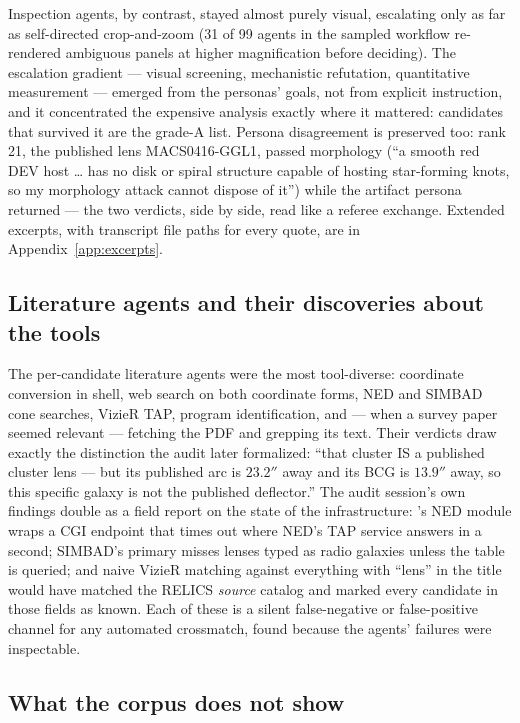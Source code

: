 \documentclass[11pt,letterpaper]{article}
\begin{document}
Inspection agents, by contrast, stayed almost purely visual, escalating only
as far as self-directed crop-and-zoom (31 of 99 agents in the sampled
workflow re-rendered ambiguous panels at higher magnification before
deciding). The escalation gradient --- visual screening, mechanistic
refutation, quantitative measurement --- emerged from the personas' goals,
not from explicit instruction, and it concentrated the expensive analysis
exactly where it mattered: candidates that survived it are the grade-A list.
Persona disagreement is preserved too: rank 21, the published lens
MACS0416-GGL1, passed morphology (``a smooth red DEV host \ldots{} has no
disk or spiral structure capable of hosting star-forming knots, so my
morphology attack cannot dispose of it'') while the artifact persona returned
 --- the two verdicts, side by side, read like a referee
exchange. Extended excerpts, with transcript file paths for every quote, are
in Appendix~\ref{app:excerpts}.

\subsection{Literature agents and their discoveries about the tools}
\label{sec:litagents}

The per-candidate literature agents were the most tool-diverse: coordinate
conversion in shell, web search on both coordinate forms, NED and SIMBAD cone
searches, VizieR TAP, program identification, and --- when a survey paper
seemed relevant --- fetching the PDF and grepping its text. Their verdicts
draw exactly the distinction the audit later formalized: ``that cluster IS a
published cluster lens --- but its published arc is $23.2''$ away and its BCG
is $13.9''$ away, so this specific galaxy is not the published deflector.''
The audit session's own findings double as a field report on the state of the
infrastructure: 's NED module wraps a CGI endpoint that
times out where NED's TAP service answers in a second; SIMBAD's primary
 misses lenses typed as radio galaxies unless the 
table is queried; and naive VizieR matching against everything with ``lens''
in the title would have matched the RELICS \emph{source} catalog and marked
every candidate in those fields as known. Each of these is a silent
false-negative or false-positive channel for any automated crossmatch, found
because the agents' failures were inspectable.

\subsection{What the corpus does not show}\label{sec:limits-reasoning}
\end{document}
